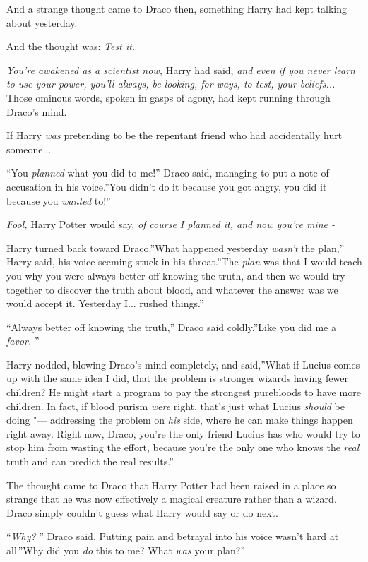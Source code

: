 And a strange thought came to Draco then, something Harry had kept
talking about yesterday.

And the thought was: \emph{Test it.}

\emph{You're awakened as a scientist now,} Harry had said, \emph{and
even if you never learn to use your power, you'll always, be looking,
for ways, to test, your beliefs...} Those ominous words, spoken in
gasps of agony, had kept running through Draco's mind.

If Harry \emph{was} pretending to be the repentant friend who had
accidentally hurt someone...

``You \emph{planned} what you did to me!'' Draco said, managing to put a
note of accusation in his voice.''You didn't do it because you got
angry, you did it because you \emph{wanted} to!''

\emph{Fool,} Harry Potter would say, \emph{of course I planned it, and
now you're mine -}

Harry turned back toward Draco.''What happened yesterday \emph{wasn't}
the plan,'' Harry said, his voice seeming stuck in his throat.''The
\emph{plan} was that I would teach you why you were always better off
knowing the truth, and then we would try together to discover the truth
about blood, and whatever the answer was we would accept it. Yesterday
I... rushed things.''

``Always better off knowing the truth,'' Draco said coldly.''Like you
did me a \emph{favor.} ''

Harry nodded, blowing Draco's mind completely, and said,''What if Lucius
comes up with the same idea I did, that the problem is stronger wizards
having fewer children? He might start a program to pay the strongest
purebloods to have more children. In fact, if blood purism \emph{were}
right, that's just what Lucius \emph{should} be doing "--- addressing the
problem on \emph{his} side, where he can make things happen right away.
Right now, Draco, you're the only friend Lucius has who would try to
stop him from wasting the effort, because you're the only one who knows
the \emph{real} truth and can predict the real results.''

The thought came to Draco that Harry Potter had been raised in a place
so strange that he was now effectively a magical creature rather than a
wizard. Draco simply couldn't guess what Harry would say or do next.

``\emph{Why?} '' Draco said. Putting pain and betrayal into his voice
wasn't hard at all.''Why did you \emph{do} this to me? What \emph{was}
your plan?''

